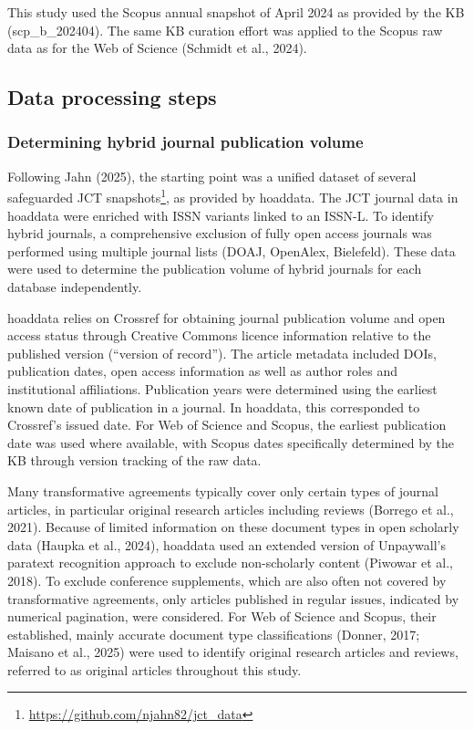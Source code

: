 \documentclass[a4paper,man,floatsintext,longtable,noextraspace,10pt]{apa6}
\begin{document}
This study used the Scopus annual snapshot of April 2024 as provided by
the KB (scp\_b\_202404). The same KB curation effort was applied to the
Scopus raw data as for the Web of Science (Schmidt et al., 2024).

\subsection{Data processing steps}\label{data-processing-steps}

\subsubsection{Determining hybrid journal publication
volume}\label{determining-hybrid-journal-publication-volume}

Following Jahn (2025), the starting point was a unified dataset of
several safeguarded JCT snapshots\footnote{\url{https://github.com/njahn82/jct_data}},
as provided by hoaddata. The JCT journal data in hoaddata were enriched
with ISSN variants linked to an ISSN-L. To identify hybrid journals, a
comprehensive exclusion of fully open access journals was performed
using multiple journal lists (DOAJ, OpenAlex, Bielefeld). These data
were used to determine the publication volume of hybrid journals for
each database independently.

hoaddata relies on Crossref for obtaining journal publication volume and
open access status through Creative Commons licence information relative
to the published version (``version of record''). The article metadata
included DOIs, publication dates, open access information as well as
author roles and institutional affiliations. Publication years were
determined using the earliest known date of publication in a journal. In
hoaddata, this corresponded to Crossref's issued date. For Web of
Science and Scopus, the earliest publication date was used where
available, with Scopus dates specifically determined by the KB through
version tracking of the raw data.

Many transformative agreements typically cover only certain types of
journal articles, in particular original research articles including
reviews (Borrego et al., 2021). Because of limited information on these
document types in open scholarly data (Haupka et al., 2024), hoaddata
used an extended version of Unpaywall's paratext recognition approach to
exclude non-scholarly content (Piwowar et al., 2018). To exclude
conference supplements, which are also often not covered by
transformative agreements, only articles published in regular issues,
indicated by numerical pagination, were considered. For Web of Science
and Scopus, their established, mainly accurate document type
classifications (Donner, 2017; Maisano et al., 2025) were used to
identify original research articles and reviews, referred to as original
articles throughout this study.
\end{document}
